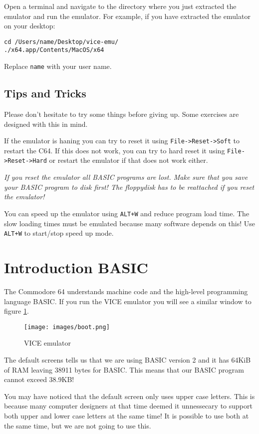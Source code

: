 \documentclass{article}
\begin{document}
Open a terminal and navigate to the directory where you just extracted the emulator and run the emulator. For example, if you have extracted the emulator on your desktop:
\begin{lstlisting}
cd /Users/name/Desktop/vice-emu/
./x64.app/Contents/MacOS/x64
\end{lstlisting}

Replace \verb:name: with your user name.

\subsection{Tips and Tricks}

Please don't hesitate to try some things before giving up.
Some exercises are designed with this in mind.

If the emulator is haning you can try to reset it using \verb:File->Reset->Soft: to restart the C64.
If this does not work, you can try to hard reset it using \verb:File->Reset->Hard: or restart the emulator if that does not work either.

\emph{If you reset the emulator all BASIC programs are lost. Make sure that you save your BASIC program to disk first!
The floppydisk has to be reattached if you reset the emulator!}

You can speed up the emulator using \verb:ALT+W: and reduce program load time.
The slow loading times must be emulated because many software depends on this!
Use \verb:ALT+W: to start/stop speed up mode.



\section{Introduction BASIC}

The Commodore 64 understands machine code and the high-level programming language BASIC.
If you run the VICE emulator you will see a similar window to figure \ref{fig:vice}.

\begin{figure}
\centering
\texttt{[image: images/boot.png]}
\caption{VICE emulator}
\label{fig:vice}
\end{figure}

The default screens tells us that we are using BASIC version 2 and it has 64KiB of RAM leaving 38911 bytes for BASIC.
This means that our BASIC program cannot exceed 38.9KB!

You may have noticed that the default screen only uses upper case letters.
This is because many computer designers at that time deemed it unnessecary to support both upper and lower case letters at the same time!
It is possible to use both at the same time, but we are not going to use this.
\end{document}
